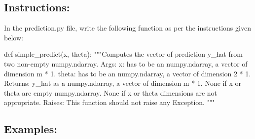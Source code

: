 \documentclass[]{article}
\newenvironment{Shaded}{\begin{snugshade}}{\end{snugshade}}
\newcommand{\CommentTok}[1]{\textcolor[rgb]{0.48,0.49,0.49}{#1}}
\newcommand{\KeywordTok}[1]{\textcolor[rgb]{0.81,0.81,0.76}{#1}}
\newcommand{\NormalTok}[1]{\textcolor[rgb]{0.81,0.81,0.76}{#1}}
\begin{document}
\hypertarget{instructions}{%
\subsection{Instructions:}\label{instructions}}

In the prediction.py file, write the following function as per the
instructions given below:

\begin{Shaded}
\begin{Highlighting}[]
\KeywordTok{def}\NormalTok{ simple_predict(x, theta):}
    \CommentTok{"""Computes the vector of prediction y_hat from two non-empty numpy.ndarray.}
\CommentTok{    Args:}
\CommentTok{      x: has to be an numpy.ndarray, a vector of dimension m * 1.}
\CommentTok{      theta: has to be an numpy.ndarray, a vector of dimension 2 * 1.}
\CommentTok{    Returns:}
\CommentTok{      y_hat as a numpy.ndarray, a vector of dimension m * 1.}
\CommentTok{      None if x or theta are empty numpy.ndarray.}
\CommentTok{      None if x or theta dimensions are not appropriate.}
\CommentTok{    Raises:}
\CommentTok{      This function should not raise any Exception.}
\CommentTok{    """}
\end{Highlighting}
\end{Shaded}

\hypertarget{examples-1}{%
\subsection{Examples:}\label{examples-1}}
\end{document}
